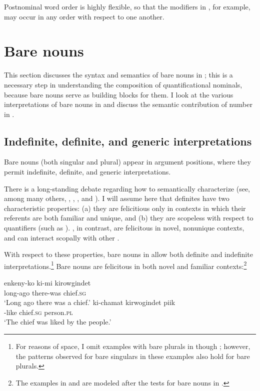 \documentclass[output=paper,newtxmath,modfonts,nonflat,hidelinks]{langsci/langscibook}
\begin{document}
\noindent Postnominal word order is highly flexible, so that the modifiers in , for example, may occur in any order with respect to one another.

\section{Bare nouns} 
\label{sec:landman:barenouns}

This section discusses the syntax and semantics of bare nouns in ; this is a necessary step in understanding the composition of quantificational nominals, because bare nouns serve as building blocks for them. I look at the various interpretations of bare nouns in  and discuss the semantic contribution of number in . 

\subsection{Indefinite, definite, and generic interpretations}
\label{sec:landman:barenounsinterpretations}
Bare nouns (both singular and plural) appear in argument positions, where they permit indefinite, definite, and generic interpretations.

There is a long-standing debate regarding how to semantically characterize  (see, among many others, \citealt{Frege:1892}, \citealt{Russell:1905}, \citealt{Heim:1982}, and \citealt{schwarz:2009}). I will assume here that definites have two characteristic properties: (a) they are felicitious only in contexts in which their referents are both familiar and unique, and (b) they are scopeless with respect to quantifiers (such as ). , in contrast, are felicitous in novel, nonunique contexts, and can interact scopally with other .

With respect to these properties, bare nouns in  allow both definite and indefinite interpretations.\footnote{For reasons of space, I omit examples with bare plurals in  though ; however, the patterns observed for bare singulars in these examples also hold for bare plurals.} Bare nouns are felicitous in both novel and familiar contexts:\footnote{The examples in  and  are modeled after the tests for bare nouns in \citet{Gillon:2015}.}

\ea \label{ex:landman:novelunique} 
  \settowidth {}  
  \ea \label{ex:landman:novel}
     \gll enkeny-ko ki-mi kirowgindet\\
          long-ago there-was chief.\textsc{sg}\\ 
     \glt ‘Long ago there was a chief.’
  \ex \label{ex:landman:familiar}
     \gll ki-chamat kirwogindet piik\\
          \PASS-like chief.\textsc{sg} person.\textsc{pl}\\ 
     \glt ‘The chief was liked by the people.’
  \z
\z 
\end{document}
